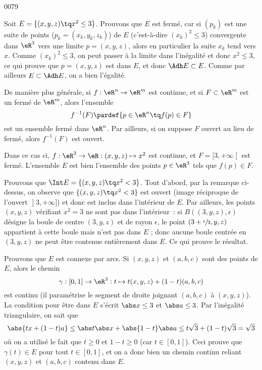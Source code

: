 
\begin{corrige}{0079}


Soit $E = \{ (x,y,z) \tq x^2 \leq 3\}$. Prouvons que $E$ est
fermé, car si $(p_k)$ est une suite de points ($p_k = (x_k,y_k,z_k)$)
de $E$ (c'est-à-dire $(x_k)^2 \leq 3$) convergente dans $\eR^3$ vers une limite
$p = (x,y,z)$, alors en particulier la suite $x_k$ tend vers
$x$. Comme $(x_k)^2 \leq 3$, on peut passer à la limite dans
l'inégalité et donc $x^2 \leq 3$, ce qui prouve que $p = (x,y,z)$ est
dans $E$, et donc $\Adh E \subset E$. Comme par ailleurs $E \subset
\Adh E$, on a bien l'égalité.

\begin{remark}
  De manière plus générale, si $f : \eR^n \to \eR^m$ est continue,
  et si $F \subset \eR^m$ est un fermé de $\eR^m$, alors l'ensemble
  \begin{equation*}
    f^{-1}(F) \pardef \{ p \in\eR^n \tq f(p) \in F \}
  \end{equation*}
  est un ensemble fermé dans $\eR^n$. Par ailleurs, si on suppose $F$
  ouvert au lieu de fermé, alors $f^{-1}(F)$ est ouvert.

  Dans ce cas ci, $f : \eR^3 \to \eR : (x,y,z) \mapsto x^2$ est
  continue, et $F = \mathopen[3,+\infty\mathclose[$ est
  fermé. L'ensemble $E$ est bien l'ensemble des points $p \in \eR^3$
  tels que $f(p) \in F$.
\end{remark}

Prouvons que $\Int E = \{ (x,y,z) \tq x^2 < 3\}$. Tout
d'abord, par la remarque ci-dessus, on observe que $\{ (x,y,z) \tq
x^2 < 3\}$ est ouvert (image réciproque de l'ouvert
$\mathopen]3,+\infty\mathclose]$) et donc est inclus dans l'intérieur
de $E$. Par ailleurs, les points $(x,y,z)$ vérifiant $x^2 = 3$ ne sont
pas dans l'intérieur~: si $B((3,y,z),\epsilon)$ désigne la boule de
centre $(3,y,z)$ et de rayon $\epsilon$, le point
$(3+\sfrac\epsilon2,y,z)$ appartient à cette boule mais n'est pas dans
$E$ ; donc aucune boule centrée en $(3,y,z)$ ne peut être contenue
entièrement dans $E$. Ce qui prouve le résultat.

Prouvons que $E$ est connexe par arcs. Si $(x,y,z)$ et $(a,b,c)$ sont
des points de $E$, alors le chemin
\begin{equation*}
  \gamma : [0,1] \to \eR^3 : t \mapsto t (x,y,z) + (1-t) (a,b,c)
\end{equation*}
est continu (il paramétrise le segment de droite joignant $(a,b,c)$ à
$(x,y,z)$). La condition pour être dans $E$ s'écrit $\abs x \leq 3$ et
$\abs a \leq 3$. Par l'inégalité triangulaire, on sait que
\begin{equation*}
  \abs{tx+(1-t)a} \leq \abs t \abs x + \abs{1-t} \abs a \leq t \sqrt3
  + (1-t) \sqrt 3 = \sqrt 3
\end{equation*}
où on a utilisé le fait que $t \geq 0$ et $1-t \geq 0$ (car $t \in
[0,1]$). Ceci prouve que $\gamma(t) \in E$ pour tout $t \in [0,1]$, et
on a donc bien un chemin continu reliant $(x,y,z)$ et $(a,b,c)$
contenu dans $E$.

\end{corrige}
